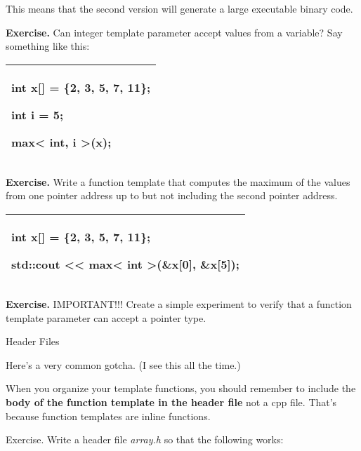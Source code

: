 \documentclass[
]{article}
\begin{document}
This means that the second version will generate a large executable
binary code.

\textbf{Exercise.} Can integer template parameter accept values from a
variable? Say something like this:

\begin{longtable}[]{@{}l@{}}
\toprule
\endhead
\begin{minipage}[t]{0.97\columnwidth}\raggedright
int x{[}{]} = \{2, 3, 5, 7, 11\};

int i = 5;

max\textless{} int, i \textgreater(x);\strut
\end{minipage}\tabularnewline
\bottomrule
\end{longtable}

\textbf{Exercise.} Write a function template that computes the maximum
of the values from one pointer address up to but not including the
second pointer address.

\begin{longtable}[]{@{}l@{}}
\toprule
\endhead
\begin{minipage}[t]{0.97\columnwidth}\raggedright
int x{[}{]} = \{2, 3, 5, 7, 11\};

std::cout \textless\textless{} max\textless{} int
\textgreater(\&x{[}0{]}, \&x{[}5{]});\strut
\end{minipage}\tabularnewline
\bottomrule
\end{longtable}

\textbf{Exercise.} IMPORTANT!!! Create a simple experiment to verify
that a function template parameter can accept a pointer type.

Header Files

Here's a very common gotcha. (I see this all the time.)

When you organize your template functions, you should remember to
include the \textbf{body of the function template in the header file}
not a cpp file. That's because function templates are inline functions.

Exercise. Write a header file \emph{array.h} so that the following
works:
\end{document}

